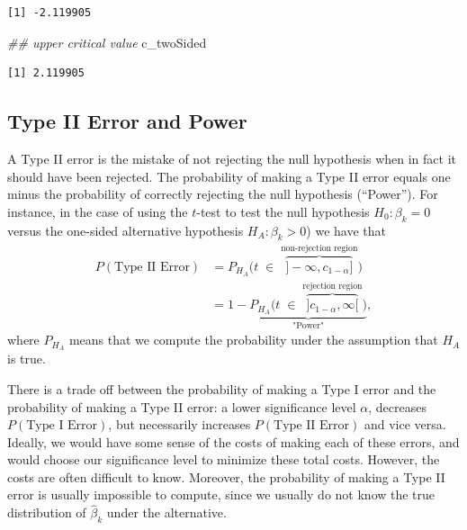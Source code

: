\documentclass[
  letterpaper,
  DIV=11,
  numbers=noendperiod]{scrreprt}
\newenvironment{Shaded}{\begin{snugshade}}{\end{snugshade}}
\newcommand{\DocumentationTok}[1]{\textcolor[rgb]{0.37,0.37,0.37}{\textit{#1}}}
\newcommand{\NormalTok}[1]{\textcolor[rgb]{0.00,0.23,0.31}{#1}}
\theoremstyle{definition}
\theoremstyle{plain}
\theoremstyle{plain}
\theoremstyle{remark}
\begin{document}
\begin{verbatim}
[1] -2.119905
\end{verbatim}

\begin{Shaded}
\begin{Highlighting}[]
\DocumentationTok{\#\# upper critical value}
\NormalTok{c\_twoSided}
\end{Highlighting}
\end{Shaded}

\begin{verbatim}
[1] 2.119905
\end{verbatim}

\hypertarget{type-ii-error-and-power}{%
\subsection{Type II Error and Power}\label{type-ii-error-and-power}}

A Type II error is the mistake of not rejecting the null hypothesis when
in fact it should have been rejected. The probability of making a Type
II error equals one minus the probability of correctly rejecting the
null hypothesis (``Power''). For instance, in the case of using the
\(t\)-test to test the null hypothesis \(H_0: \beta_k=0\) versus the
one-sided alternative hypothesis \(H_A:\beta_k>0\)) we have that
\begin{align*}
P(\text{Type II Error})
&=P_{H_A}\Big(t\;\in\;\overbrace{]-\infty,c_{1-\alpha}]}^{\text{non-rejection region}}\Big)\\
&=1-\underbrace{P_{H_A}\Big(t\;\in\;\overbrace{]c_{1-\alpha},\infty[}^{\text{rejection region}}\Big)}_{\text{"Power"}},
\end{align*} where \(P_{H_A}\) means that we compute the probability
under the assumption that \(H_A\) is true.

There is a trade off between the probability of making a Type I error
and the probability of making a Type II error: a lower significance
level \(\alpha\), decreases \(P(\text{Type I Error})\), but necessarily
increases \(P(\text{Type II Error})\) and vice versa. Ideally, we would
have some sense of the costs of making each of these errors, and would
choose our significance level to minimize these total costs. However,
the costs are often difficult to know. Moreover, the probability of
making a Type II error is usually impossible to compute, since we
usually do not know the true distribution of \(\hat\beta_k\) under the
alternative.
\end{document}

